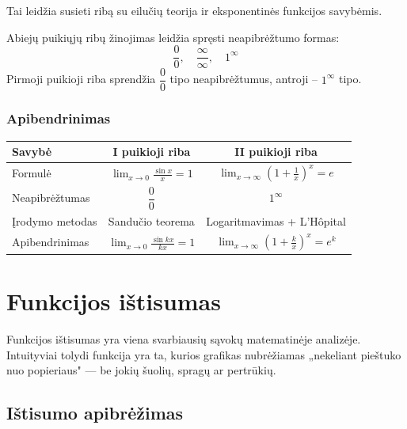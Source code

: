 Tai leidžia susieti ribą su eilučių teorija ir eksponentinės funkcijos savybėmis.

\begin{remark}
Abiejų puikiųjų ribų žinojimas leidžia spręsti neapibrėžtumo formas:
\[
  \frac{0}{0}, \quad \frac{\infty}{\infty}, \quad 1^\infty
\]
Pirmoji puikioji riba sprendžia $\dfrac{0}{0}$ tipo neapibrėžtumus, antroji – $1^\infty$ tipo.
\end{remark}

\subsubsection*{Apibendrinimas}

\begin{center}
\renewcommand{\arraystretch}{2}
\begin{tabular}{|l|c|c|}
\hline
\textbf{Savybė} & \textbf{I puikioji riba} & \textbf{II puikioji riba} \\
\hline
Formulė & $\displaystyle\lim_{x \to 0}\frac{\sin x}{x} = 1$ & $\displaystyle\lim_{x \to \infty}\!\left(1{+}\frac{1}{x}\right)^x = e$ \\
\hline
Neapibrėžtumas & $\dfrac{0}{0}$ & $1^\infty$ \\
\hline
Įrodymo metodas & Sandučio teorema & Logaritmavimas + L'Hôpital \\
\hline
Apibendrinimas & $\displaystyle\lim_{x \to 0}\frac{\sin kx}{kx} = 1$ & $\displaystyle\lim_{x \to \infty}\!\left(1{+}\frac{k}{x}\right)^x = e^k$ \\
\hline
\end{tabular}
\end{center}

\section{Funkcijos ištisumas}

Funkcijos ištisumas yra viena svarbiausių sąvokų matematinėje analizėje.
Intuityviai tolydi funkcija yra ta, kurios grafikas nubrėžiamas „nekeliant
pieštuko nuo popieriaus" — be jokių šuolių, spragų ar pertrūkių.

\subsection{Ištisumo apibrėžimas}


